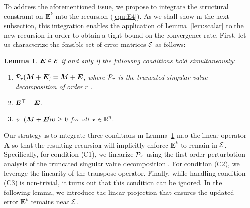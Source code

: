 \documentclass{article}
\def\P{{\cal P}}
\def\E{{\cal E}}
\def\R{{\mathbb R}}
\newcommand{\hlnew}[1]{{#1}}
\newtheorem{lemma}{Lemma}
\newcommand{\topnew}{\top \hspace{-0.05cm}}
\begin{document}
\hlnew{To address the aforementioned issue, we propose to integrate the structural constraint on $\bm E^k$ into the recursion} (\ref{equ:E4}). \hlnew{As we shall show in the next subsection, this integration enables the application of Lemma}~\ref{lem:scalar} \hlnew{to the new recursion in order to obtain a tight bound on the convergence rate. First, let us characterize the feasible set of error matrices $\E$ as follows:}
\begin{lemma} \label{lem:E}
$\bm E \in \E$ if and only if the following conditions hold simultaneously:
\begin{enumerate}
    \item[(C1)] $\P_r(\bm M + \bm E) = \bm M + \bm E$, where $\P_r$ is the truncated singular value decomposition of order $r$ \cite{eckart1936approximation}.
    \item[(C2)] $\bm E^\topnew = \bm E$.
    \item[(C3)] $\bm v^\topnew (\bm M + \bm E) \bm v \geq 0$ for all $\bm v \in \R^n$.
\end{enumerate}
\end{lemma}
\noindent %
Our strategy is to integrate three conditions in Lemma~\ref{lem:E} into the linear operator $\bm A$ so that the resulting recursion will implicitly enforce $\bm E^k$ to remain in $\E$. Specifically, for condition (C1), we linearize $\P_r$ using the first-order perturbation analysis of the truncated singular value decomposition \cite{vu2020perturbation}. For condition (C2), we leverage the linearity of the transpose operator. \hlnew{Finally, while handling condition (C3) is non-trivial, it turns out that this condition can be ignored.}
In the following lemma, we introduce the linear projection that ensures the updated error ${\bm E}^k$ remains near $\E$.
\end{document}
